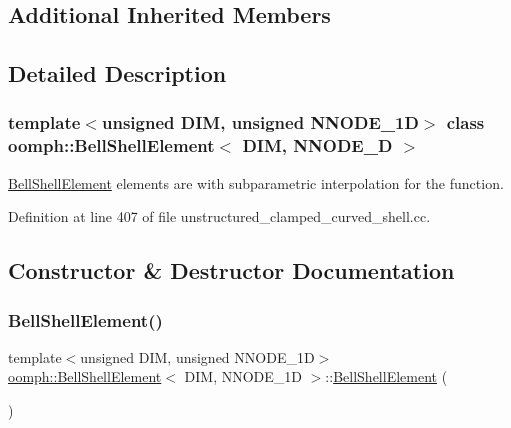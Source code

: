 \subsection*{Additional Inherited Members}


\subsection{Detailed Description}
\subsubsection*{template$<$unsigned D\+IM, unsigned N\+N\+O\+D\+E\+\_\+1D$>$\newline
class oomph\+::\+Bell\+Shell\+Element$<$ D\+I\+M, N\+N\+O\+D\+E\+\_\+D $>$}

\hyperlink{classoomph_1_1BellShellElement}{Bell\+Shell\+Element} elements are with subparametric interpolation for the function. 

Definition at line 407 of file unstructured\+\_\+clamped\+\_\+curved\+\_\+shell.\+cc.



\subsection{Constructor \& Destructor Documentation}
\mbox{\label{classoomph_1_1BellShellElement_a9c8946b0c97fc993db62acafc76301d8}} 
\subsubsection{\texorpdfstring{Bell\+Shell\+Element()}{BellShellElement()}\hspace{0.1cm}{\footnotesize\ttfamily [1/2]}}
{\footnotesize\ttfamily template$<$unsigned D\+IM, unsigned N\+N\+O\+D\+E\+\_\+1D$>$ \\
\hyperlink{classoomph_1_1BellShellElement}{oomph\+::\+Bell\+Shell\+Element}$<$ D\+IM, N\+N\+O\+D\+E\+\_\+1D $>$\+::\hyperlink{classoomph_1_1BellShellElement}{Bell\+Shell\+Element} (\begin{DoxyParamCaption}{ }\end{DoxyParamCaption})\hspace{0.3cm}{\ttfamily [inline]}}



